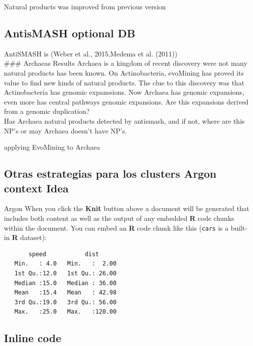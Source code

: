 \documentclass[12pt,twoside]{reedthesis}
\begin{document}
  Natural products was improved from previous version
  
  \subsection{AntisMASH optional DB}\label{antismash-optional-db}
  
  AntiSMASH is (Weber et al., 2015,Medema et al. (2011))\\
  \#\#\# Archaeas Results Archaea is a kingdom of recent discovery were
  not many natural products has been known. On Actinobacteria, evoMining
  has proved its value to find new kinds of natural products. The clue to
  this discovery was that Actinobacteria has genomic expanssions. Now
  Archaea has genomic expansions, even more has central pathways genomic
  expansions. Are this expansions derived from a genomic duplication?\\
  Has Archaea natural products detected by antismash, and if not, where
  are this NP's or may Archaea doesn't have NP's.
  
  applying EvoMining to Archaea
  
  \subsection{Otras estrategias para los clusters Argon context
  Idea}\label{otras-estrategias-para-los-clusters-argon-context-idea}
  
  Argon When you click the \textbf{Knit} button above a document will be
  generated that includes both content as well as the output of any
  embedded \textbf{R} code chunks within the document. You can embed an
  \textbf{R} code chunk like this (\texttt{cars} is a built-in \textbf{R}
  dataset):
  
  \begin{Shaded}
  \begin{Highlighting}[]
  \end{Highlighting}
  \end{Shaded}
  
  \begin{verbatim}
       speed           dist       
   Min.   : 4.0   Min.   :  2.00  
   1st Qu.:12.0   1st Qu.: 26.00  
   Median :15.0   Median : 36.00  
   Mean   :15.4   Mean   : 42.98  
   3rd Qu.:19.0   3rd Qu.: 56.00  
   Max.   :25.0   Max.   :120.00  
  \end{verbatim}
  
  \subsection{Inline code}\label{inline-code}
  
\end{document}
